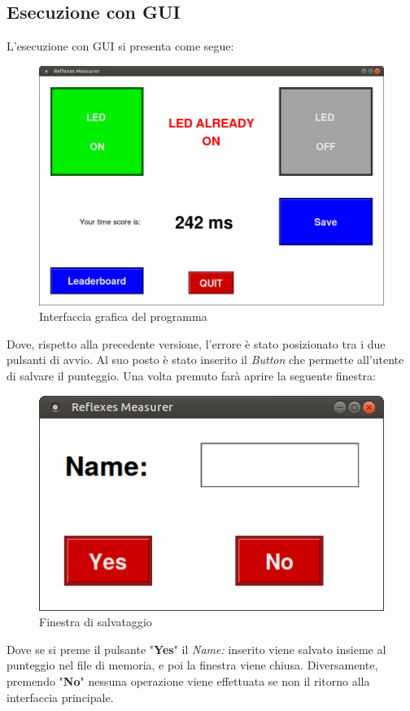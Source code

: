 \documentclass[a4paper]{article}
\begin{document}
	\subsection{Esecuzione con GUI}
		L'esecuzione con GUI si presenta come segue:
		\begin{figure}[H]
			\centering
			\includegraphics[scale=0.35]{img/GUI.png}
			\caption{Interfaccia grafica del programma}
		\end{figure}
		Dove, rispetto alla precedente versione, l'errore è stato posizionato tra i due pulsanti di avvio.
		Al suo posto è stato inserito il \textit{Button} che permette all'utente di salvare il punteggio. Una volta premuto farà aprire la seguente finestra:
		\begin{figure}[H]
			\centering
			\includegraphics[scale=0.35]{img/save.png}
			\caption{Finestra di salvataggio}
		\end{figure}
		Dove se si preme il pulsante "\textbf{Yes}" il \textit{Name:} inserito viene salvato insieme al punteggio nel file di memoria, e poi la finestra viene chiusa. Diversamente, premendo "\textbf{No}" nessuna operazione viene effettuata se non il ritorno alla interfaccia principale.\newline
\end{document}
